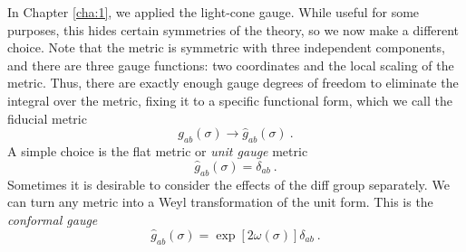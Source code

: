 In Chapter \ref{cha:1}, we applied the light-cone gauge. While useful for some purposes, this hides certain symmetries of the theory, so we now make a different choice. Note that the metric is symmetric with three independent components, and there are three gauge functions: two coordinates and the local scaling of the metric.    
Thus, there are exactly enough gauge degrees of freedom to eliminate the integral over the metric, fixing it to a specific functional form, which we call the fiducial metric    
\begin{equation}
	g_{a b}(\sigma) \rightarrow \hat{g}_{a b}(\sigma) \:. \label{3.3.2}
\end{equation}
A simple choice is the flat metric or \emph{unit gauge} metric    
\begin{equation}\label{3.3.3}
	\hat{g}_{a b}(\sigma)=\delta_{a b} \:. 
\end{equation}
Sometimes it is desirable to consider the effects of the diff group separately. We can turn any metric into a Weyl transformation of the unit form.    
This is the \emph{conformal gauge}    
\begin{equation}
	\hat{g}_{a b}(\sigma)=\exp [2 \omega(\sigma)] \delta_{a b} \:. \label{3.3.4}
\end{equation}
